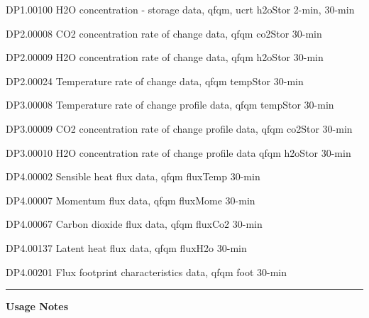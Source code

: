 \documentclass[]{article}
\begin{document}
DP1.00100 H2O concentration - storage \textbar{} data, qfqm, ucrt
\textbar{} h2oStor \textbar{} 2-min, 30-min

DP2.00008 CO2 concentration rate of change \textbar{} data, qfqm
\textbar{} co2Stor \textbar{} 30-min

DP2.00009 H2O concentration rate of change \textbar{} data, qfqm
\textbar{} h2oStor \textbar{} 30-min

DP2.00024 Temperature rate of change \textbar{} data, qfqm \textbar{}
tempStor \textbar{} 30-min

DP3.00008 Temperature rate of change profile \textbar{} data, qfqm
\textbar{} tempStor \textbar{} 30-min

DP3.00009 CO2 concentration rate of change profile \textbar{} data, qfqm
\textbar{} co2Stor \textbar{} 30-min

DP3.00010 H2O concentration rate of change profile data \textbar{} qfqm
\textbar{} h2oStor \textbar{} 30-min

DP4.00002 Sensible heat flux \textbar{} data, qfqm \textbar{} fluxTemp
\textbar{} 30-min

DP4.00007 Momentum flux \textbar{} data, qfqm \textbar{} fluxMome
\textbar{} 30-min

DP4.00067 Carbon dioxide flux \textbar{} data, qfqm \textbar{} fluxCo2
\textbar{} 30-min

DP4.00137 Latent heat flux \textbar{} data, qfqm \textbar{} fluxH2o
\textbar{} 30-min

DP4.00201 Flux footprint characteristics \textbar{} data, qfqm
\textbar{} foot \textbar{} 30-min

\begin{center}\rule{0.5\linewidth}{\linethickness}\end{center}

\textbf{Usage Notes}
\end{document}
